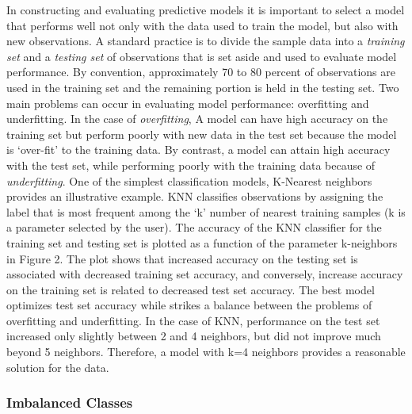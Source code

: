 \documentclass[sigconf]{acmart}
\begin{document}
In constructing and evaluating predictive models it is important to select 
a model that performs well not only with the data used to train the model, 
but also with new observations. A standard practice is to divide the sample 
data into a \emph{training set} and a \emph{testing set} of observations that 
is set aside and used to evaluate model performance. By convention, approximately 
70 to 80 percent of observations are used in the training set and the remaining 
portion is held in the testing set. Two main problems can occur in evaluating 
model performance: overfitting and underfitting. In the case of 
\emph{overfitting}, A model can have high accuracy on the training set 
but perform poorly with new data in the test set because the model is 
`over-fit' to the training data. By contrast, a model can attain high 
accuracy with the test set, while performing poorly with the training data 
because of \emph{underfitting}. One of the simplest classification models, 
K-Nearest neighbors provides an illustrative example. KNN classifies 
observations by assigning the label that is most frequent among the `k' 
number of nearest training samples (k is a parameter selected by the user). 
The accuracy of the KNN classifier for the training set and testing set is 
plotted as a function of the parameter k-neighbors in Figure 2. The plot 
shows that increased accuracy on the testing set is associated with 
decreased training set accuracy, and conversely, increase accuracy on 
the training set is related to decreased test set accuracy. The best model 
optimizes test set accuracy while strikes a balance between the problems of 
overfitting and underfitting. In the case of KNN, performance on the test set 
increased only slightly between 2 and 4 neighbors, but did not improve much 
beyond 5 neighbors. Therefore, a model with k=4 neighbors provides a 
reasonable solution for the data. 


\subsubsection{Imbalanced Classes}
\end{document}

